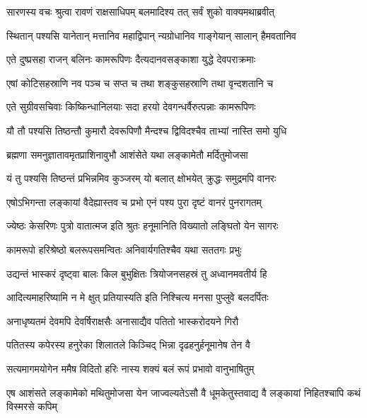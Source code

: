 
\twolineshloka
{सारणस्य वचः श्रुत्वा रावणं राक्षसाधिपम्}
{बलमादिश्य तत् सर्वं शुको वाक्यमथाब्रवीत्} %

\twolineshloka
{स्थितान् पश्यसि यानेतान् मत्तानिव महाद्विपान्}
{न्यग्रोधानिव गाङ्गेयान् सालान् हैमवतानिव} %

\twolineshloka
{एते दुष्प्रसहा राजन् बलिनः कामरूपिणः}
{दैत्यदानवसङ्काशा युद्धे देवपराक्रमाः} %

\twolineshloka
{एषां कोटिसहस्राणि नव पञ्च च सप्त च}
{तथा शङ्कुसहस्राणि तथा वृन्दशतानि च} %

\twolineshloka
{एते सुग्रीवसचिवाः किष्किन्धानिलयाः सदा}
{हरयो देवगन्धर्वैरुत्पन्नाः कामरूपिणः} %

\twolineshloka
{यौ तौ पश्यसि तिष्ठन्तौ कुमारौ देवरूपिणौ}
{मैन्दश्च द्विविदश्चैव ताभ्यां नास्ति समो युधि} %

\twolineshloka
{ब्रह्मणा समनुज्ञातावमृतप्राशिनावुभौ}
{आशंसेते यथा लङ्कामेतौ मर्दितुमोजसा} %

\twolineshloka
{यं तु पश्यसि तिष्ठन्तं प्रभिन्नमिव कुञ्जरम्}
{यो बलात् क्षोभयेत् क्रुद्धः समुद्रमपि वानरः} %

\twolineshloka
{एषोऽभिगन्ता लङ्कायां वैदेह्यास्तव च प्रभो}
{एनं पश्य पुरा दृष्टं वानरं पुनरागतम्} %

\twolineshloka
{ज्येष्ठः केसरिणः पुत्रो वातात्मज इति श्रुतः}
{हनूमानिति विख्यातो लङ्घितो येन सागरः} %

\twolineshloka
{कामरूपो हरिश्रेष्ठो बलरूपसमन्वितः}
{अनिवार्यगतिश्चैव यथा सततगः प्रभुः} %

\twolineshloka
{उद्यन्तं भास्करं दृष्ट्वा बालः किल बुभुक्षितः}
{त्रियोजनसहस्रं तु अध्वानमवतीर्य हि} %

\twolineshloka
{आदित्यमाहरिष्यामि न मे क्षुत् प्रतियास्यति}
{इति निश्चित्य मनसा पुप्लुवे बलदर्पितः} %

\twolineshloka
{अनाधृष्यतमं देवमपि देवर्षिराक्षसैः}
{अनासाद्यैव पतितो भास्करोदयने गिरौ} %

\twolineshloka
{पतितस्य कपेरस्य हनुरेका शिलातले}
{किञ्चिद् भिन्ना दृढहनुर्हनूमानेष तेन वै} %

\twolineshloka
{सत्यमागमयोगेन ममैष विदितो हरिः}
{नास्य शक्यं बलं रूपं प्रभावो वानुभाषितुम्} %

\threelineshloka
{एष आशंसते लङ्कामेको मथितुमोजसा}
{येन जाज्वल्यतेऽसौ वै धूमकेतुस्तवाद्य वै}
{लङ्कायां निहितश्चापि कथं विस्मरसे कपिम्} %

